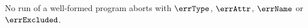 \begin{conjecture}
\label{conj:type-soundness}
No run of a well-formed program aborts with $\errType$, $\errAttr$, $\errName$ or $\errExcluded$.
\end{conjecture}
